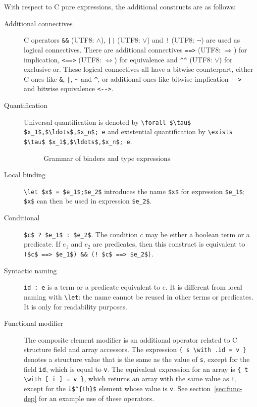 With respect to C pure expressions, the additional constructs are as follows:
\begin{description}
\item[Additional connectives] C operators \lstinline|&&| (UTF8:
  $\land$), \lstinline+||+ (UTF8: $\lor$) and \lstinline|!| (UTF8:
  $\neg$) are used as logical connectives. There are additional
  connectives \lstinline|==>| (UTF8: $\Longrightarrow$) for
  implication, \lstinline|<==>| (UTF8: $\Longleftrightarrow$) for
  equivalence and \lstinline|^^| (UTF8: \underline{\ensuremath{\lor}})
  for exclusive
  or. These logical connectives all have a bitwise counterpart, either
  C ones like \lstinline|&|, \lstinline+|+, \lstinline|~| and
  \lstinline|^|, or additional ones like bitwise implication
  \lstinline|-->| and bitwise equivalence \lstinline|<-->|.

\item[Quantification] Universal quantification is denoted by
  \lstinline|\forall $\tau$ $x_1$,$\ldots$,$x_n$; e| and existential
  quantification by \lstinline|\exists $\tau$ $x_1$,$\ldots$,$x_n$; e|.

\begin{figure}[htp]
  \begin{cadre} 
    \end{cadre}
  \caption{Grammar of binders and type expressions}
\label{fig:gram:binders}
\end{figure}

\item[Local binding]
    \lstinline|\let $x$ = $e_1$;$e_2$|
    introduces the name \lstinline|$x$| for
    expression \lstinline|$e_1$|; \lstinline|$x$| can then be used in expression
    \lstinline|$e_2$|.

\item[Conditional] \lstinline|$c$ ? $e_1$ : $e_2$|. The condition $c$ may be
	either a boolean term or a predicate. If $e_1$ and $e_2$ are predicates,
	then this construct is equivalent to
	\lstinline|($c$ ==> $e_1$) && (! $c$ ==> $e_2$)|.

\item[Syntactic naming] \lstinline|id : e| is a term or a predicate
  equivalent to $e$. It is different from local naming with \lstinline|\let|:
  the name cannot be reused in other terms or predicates. It is only
  for readability purposes.

\item[Functional modifier]
  The composite element modifier is an additional
  operator related to C structure field and array accessors.
  The expression \lstinline|{ s \with .id = v }|
  denotes a structure value that is the same as the value of \lstinline|s|, except for the field
  \lstinline|id|, which is equal to \lstinline|v|.
  The equivalent expression for an array is
  \lstinline|{ t \with [ i ] = v }|,
  which returns an array with the same value as \lstinline|t|, except for the
  \lstinline|i$^{th}$| element whose value
  is \lstinline|v|.
  See section~\ref{sec:func-dep} for an example use of these operators.


\end{description}
